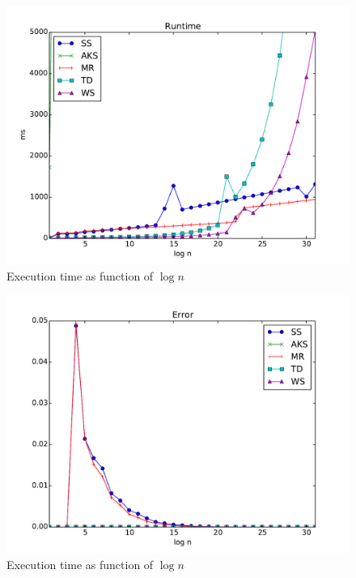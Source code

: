 \begin{figure}
        \centering
        \includegraphics[width=\columnwidth]{results/runtime.pdf}
        \caption{Execution time as function of $\log n$}
        \label{fig:executionTime1}
\end{figure}

\begin{figure}
        \centering
        \includegraphics[width=\columnwidth]{results/performance.pdf}
        \caption{Execution time as function of $\log n$}
        \label{fig:executionTime1}
\end{figure}




